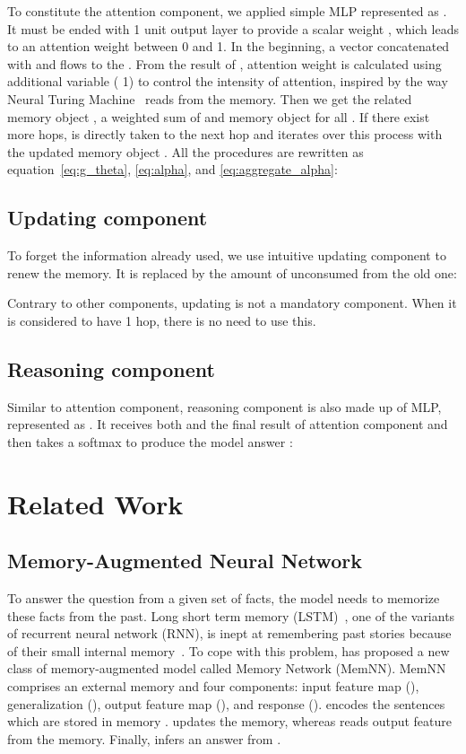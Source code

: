\documentclass{article} \usepackage{iclr2018_conference,times}
\begin{document}
To constitute the attention component, we applied simple MLP represented as .
It must be ended with 1 unit output layer to provide a scalar weight , which leads to an attention weight  between 0 and 1.
In the beginning, a vector concatenated with  and  flows to the .
From the result of , attention weight  is calculated using additional variable  ( 1) to control the intensity of attention, inspired by the way Neural Turing Machine~\citep{graves2014neural} reads from the memory.
Then we get the related memory object , a weighted sum of  and memory object  for all .
If there exist more hops,  is directly taken to the next hop and iterates over this process with the updated memory object .
All the procedures are rewritten as equation~\ref{eq:g_theta}, \ref{eq:alpha}, and \ref{eq:aggregate_alpha}:





\subsection{Updating component} 
To forget the information already used, we use intuitive updating component to renew the memory.
It is replaced by the amount of unconsumed from the old one:

Contrary to other components, updating is not a mandatory component.
When it is considered to have 1 hop, there is no need to use this.


\subsection{Reasoning component} 
Similar to attention component, reasoning component is also made up of MLP, represented as .
It receives both  and the final result of attention component  and then takes a softmax to produce the model answer :




\section{Related Work}



\subsection{Memory-Augmented Neural Network}
To answer the question from a given set of facts, the model needs to memorize these facts from the past. 
Long short term memory (LSTM)~\citep{hochreiter1997long}, one of the variants of recurrent neural network (RNN), is inept at remembering past stories because of their small internal memory~\citep{sukhbaatar2015end}. 
To cope with this problem, \citet{Weston15} has proposed a new class of memory-augmented model called Memory Network (MemNN). 
MemNN comprises an external memory  and four components: input feature map (), generalization (), output feature map (), and response (). 
 encodes the sentences which are stored in memory .
 updates the memory, whereas  reads output feature  from the memory.
Finally,  infers an answer from .
\end{document}
